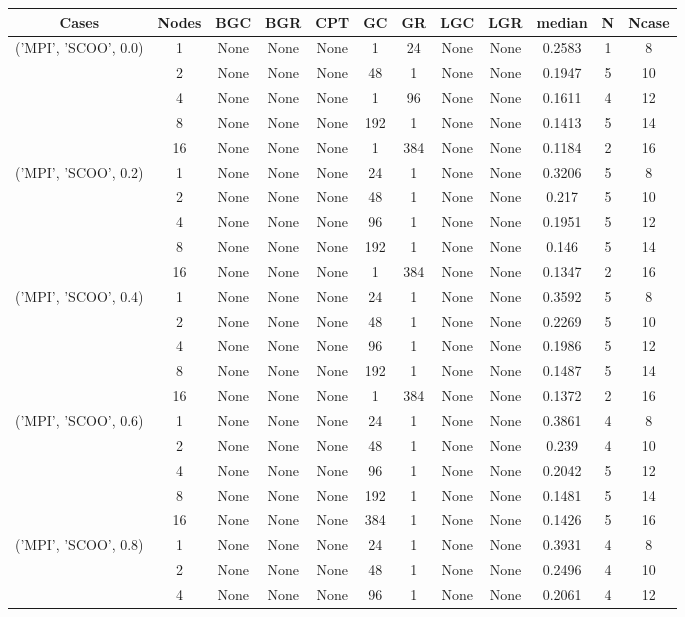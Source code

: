 \begin{tabular}{cccccccccccc}
\hline
Cases & Nodes& BGC& BGR& CPT& GC& GR& LGC& LGR& median & N & Ncase \\
\hline
\multirow{5}{*}{('MPI', 'SCOO', 0.0)}& 1& None& None& None& 1& 24& None& None& 0.2583& 1& 8\\
& 2& None& None& None& 48& 1& None& None& 0.1947& 5& 10\\
& 4& None& None& None& 1& 96& None& None& 0.1611& 4& 12\\
& 8& None& None& None& 192& 1& None& None& 0.1413& 5& 14\\
& 16& None& None& None& 1& 384& None& None& 0.1184& 2& 16\\
\hline
\multirow{5}{*}{('MPI', 'SCOO', 0.2)}& 1& None& None& None& 24& 1& None& None& 0.3206& 5& 8\\
& 2& None& None& None& 48& 1& None& None& 0.217& 5& 10\\
& 4& None& None& None& 96& 1& None& None& 0.1951& 5& 12\\
& 8& None& None& None& 192& 1& None& None& 0.146& 5& 14\\
& 16& None& None& None& 1& 384& None& None& 0.1347& 2& 16\\
\hline
\multirow{5}{*}{('MPI', 'SCOO', 0.4)}& 1& None& None& None& 24& 1& None& None& 0.3592& 5& 8\\
& 2& None& None& None& 48& 1& None& None& 0.2269& 5& 10\\
& 4& None& None& None& 96& 1& None& None& 0.1986& 5& 12\\
& 8& None& None& None& 192& 1& None& None& 0.1487& 5& 14\\
& 16& None& None& None& 1& 384& None& None& 0.1372& 2& 16\\
\hline
\multirow{5}{*}{('MPI', 'SCOO', 0.6)}& 1& None& None& None& 24& 1& None& None& 0.3861& 4& 8\\
& 2& None& None& None& 48& 1& None& None& 0.239& 4& 10\\
& 4& None& None& None& 96& 1& None& None& 0.2042& 5& 12\\
& 8& None& None& None& 192& 1& None& None& 0.1481& 5& 14\\
& 16& None& None& None& 384& 1& None& None& 0.1426& 5& 16\\
\hline
\multirow{5}{*}{('MPI', 'SCOO', 0.8)}& 1& None& None& None& 24& 1& None& None& 0.3931& 4& 8\\
& 2& None& None& None& 48& 1& None& None& 0.2496& 4& 10\\
& 4& None& None& None& 96& 1& None& None& 0.2061& 4& 12\\

\end{tabular}
